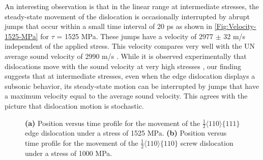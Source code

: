 \documentclass[applsci,article,submit,pdftex,moreauthors]{Definitions/mdpi}
\newcommand{\?}{\stackrel{?}{=}}
\begin{document}
An interesting observation is that in the linear range at intermediate stresses, the steady-state movement of the dislocation is occasionally interrupted by abrupt jumps that occur within a small time interval of 20 ps as shown in \cref{Fig:Velocity-1525-MPa} for $\tau$ = 1525 MPa. These jumps have a velocity of 2977 $\pm$ 32 m/s independent of the applied stress. This velocity compares very well with the UN average sound velocity of 2990 m/s \cite{Baranov2013}. While it is observed experimentally that dislocations move with the sound velocity at very high stresses \cite{Johnston1959}, our finding suggests that at intermediate stresses, even when the edge dislocation displays a subsonic behavior, its steady-state motion can be interrupted by jumps that have a maximum velocity equal to the average sound velocity. This agrees with the picture that dislocation motion is stochastic.

\begin{figure}[h!]
\centering
{}
\hfill
{}

\caption{\textbf{(a)} Position versus time profile for the movement of the $\frac{1}{2} \langle 110 \rangle \{ 111 \}$ edge dislocation under a stress of 1525 MPa. \textbf{(b)} Position versus time profile for the movement of the $\frac{1}{2} \langle 110 \rangle \{ 110 \}$ screw dislocation under a stress of 1000 MPa.}
\label{}
\end{figure}
\end{document}
